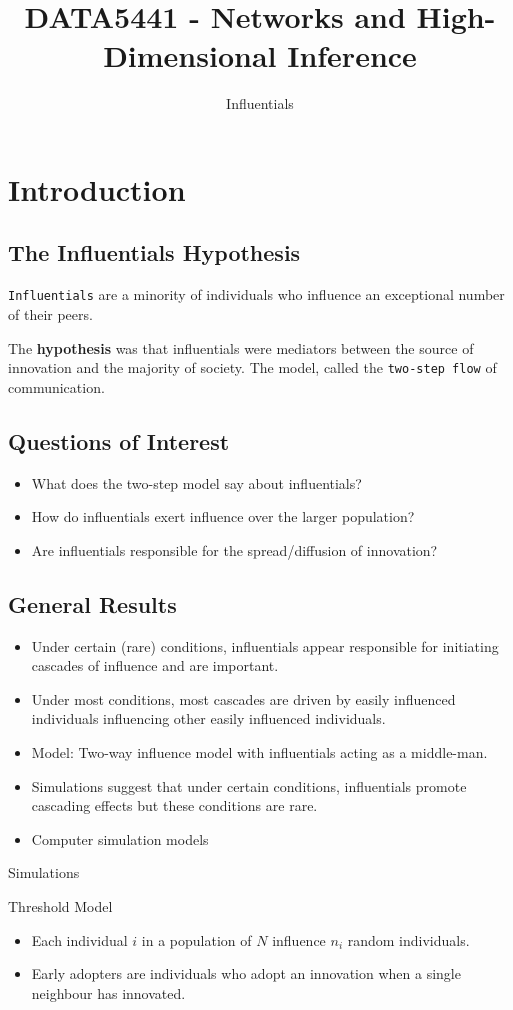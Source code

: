 \documentclass[10pt, oneside, reqno]{amsart}
\title{DATA5441 - Networks and High-Dimensional Inference}                                %
\author{Influentials}
\date{}                                           %
\theoremstyle{plain}%
\theoremstyle{definition}
\theoremstyle{remark}
\begin{document}
\maketitle \tableofcontents \clearpage

\section{Introduction}

\subsection{The Influentials Hypothesis}
\texttt{Influentials} are a minority of individuals who influence an exceptional 
number of their peers. 

The \textbf{hypothesis} was that influentials were mediators between the source of innovation and the majority 
of society. The model, called the \texttt{two-step flow} of communication.

\subsection{Questions of Interest}
\begin{itemize}
    \item What does the two-step model say about influentials?
    \item How do influentials exert influence over the larger population?
    \item Are influentials responsible for the spread/diffusion of innovation?
\end{itemize}




\subsection{General Results}

\begin{itemize}
    \item Under certain (rare) conditions, influentials appear responsible for 
    initiating cascades of influence and are important.
    \item Under most conditions, most cascades are driven by easily influenced individuals
    influencing other easily influenced individuals.
\end{itemize}


\begin{itemize}
    \item Model: Two-way influence model with influentials acting as a middle-man.
    \item Simulations suggest that under certain conditions, influentials promote 
    cascading effects but these conditions are rare.
    \item Computer simulation models 
\end{itemize}


Simulations 

Threshold Model
\begin{itemize}
    \item Each individual $i$ in a population of $N$ influence $n_i$ random individuals.
    \item Early adopters are individuals who adopt an innovation when a single neighbour has innovated.
\end{itemize}
\end{document}
